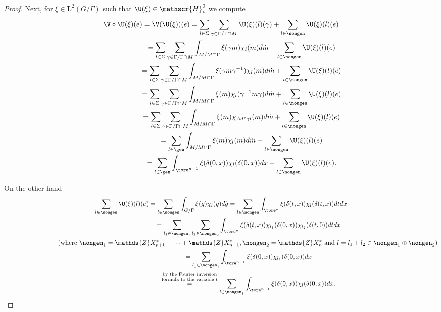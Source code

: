 \begin{proof}
Next, for $\xi\in \mathbf{L}^2(G/\Gamma)$ such that $\U(\xi)\in
\mathscr{H}_\rho^0$ we compute
\begin{gather*}
\V\circ \U(\xi)(e)  = \V(\U(\xi))(e)
 =  \sum_{l\in \Sigma} \sum_{\gamma\in \Gamma/\Gamma\cap M}
\U(\xi)(l)(\gamma)+ \sum
_{l\in \nongen}\U(\xi)(l)(e)\\
 \phantom{\V\circ \U(\xi)(e)}{}
 =  \sum_{l\in \Sigma} \sum_{\gamma\in \Gamma/\Gamma\cap M}
\int_{M/M\cap \Gamma}\xi(\gamma m) \chi_l(m) d\dot{m} + \sum
_{l\in \nongen}\U(\xi)(l)(e)\\
\phantom{\V\circ \U(\xi)(e)}{}
=  \sum_{l\in \Sigma} \sum_{\gamma\in \Gamma/\Gamma\cap M}
\int_{M/M\cap \Gamma} \xi(\gamma m \gamma^{-1} ) \chi_l(m) d\dot{m}
+ \sum
_{l\in \nongen}\U(\xi)(l)(e)\\
\phantom{\V\circ \U(\xi)(e)}{}
=  \sum_{l\in \Sigma} \sum_{\gamma\in \Gamma/\Gamma\cap M}
\int_{M/M\cap \Gamma} \xi( m  ) \chi_l( \gamma^{-1} m \gamma)
d\dot{m} + \sum
_{l\in \nongen}\U(\xi)(l)(e)\\
\phantom{\V\circ \U(\xi)(e)}{}
=  \sum_{l\in \Sigma} \sum_{\gamma\in \Gamma/\Gamma\cap M}
\int_{M/M\cap \Gamma} \xi( m  ) \chi_{Ad^* \gamma l}(  m ) d\dot{m}
+ \sum
_{l\in \nongen}\U(\xi)(l)(e)\\
\phantom{\V\circ \U(\xi)(e)}{}
=  \sum_{l\in \gen}  \int_{M/M\cap \Gamma} \xi( m  ) \chi_l( m )
d\dot{m} + \sum
_{l\in \nongen}\U(\xi)(l)(e)\\
\phantom{\V\circ \U(\xi)(e)}{}
=  \sum_{l\in \gen} \int_{\tore^{n-1}} \xi(\delta(0, x))
\chi_l(\delta(0, x))dx  + \sum _{l\in \nongen}\U(\xi)(l)(e).
\end{gather*}

On the other hand
\begin{gather*}
\sum _{l\in \nongen}\U(\xi)(l)(e) = \sum _{l\in \nongen}
\int_{G/\Gamma} \xi(g) \chi_l(g) d\dot{g}
 = \sum_{l\in \nongen}\int_{\tore^{n}}
    \xi(\delta(t, x))
 \chi_l(\delta(t, x)) dt dx \\
\hphantom{\sum _{l\in \nongen}\U(\xi)(l)(e)}{}
 = \sum_{l_1\in \nongen_1} \sum_{l_2\in \nongen_2} \int_{\tore^{n}}
    \xi(\delta(t, x))
 \chi_{l_1}(\delta(0, x)) \chi_{l_2}(\delta(t, 0) ) dt dx \\
\hphantom{\sum _{l\in \nongen}\U(\xi)(l)(e)}{}
(\text{where } \nongen_1 = \mathds{Z} X_{p+1}^*+\cdots+\mathds{Z}X_{n-1}^*,
     \nongen_2 =\mathds{Z}X_{n}^* \text{ and } l = l_1+l_2
      \in \nongen_1\oplus \nongen_2) \\
\hphantom{\sum _{l\in \nongen}\U(\xi)(l)(e)}{}
= \sum_{l_1\in \nongen_1} \int_{\tore^{n-1}}
    \xi(\delta(0, x))
\chi_{l_1}(\delta(0, x))   dx \\
\hphantom{\sum _{l\in \nongen}\U(\xi)(l)(e)}{}
\overset{\mbox{\scriptsize $\begin{array}{@{}c@{}}\text{by the Fourier inversion} \\ \text{formula to the variable  $t$}\end{array}$}}{=} \sum_{l\in \nongen_1} \int_{\tore^{n-1}}
    \xi(\delta(0, x))
 \chi_{l}(\delta(0, x))  dx.
\end{gather*}


\end{proof}
